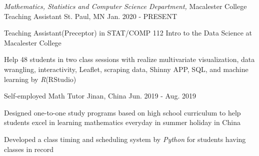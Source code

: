

\begin{cventries}

  \cventry
    {\textit{Mathematics, Statistics and Computer Science Department,} Macalester College} %
    {Teaching Assistant} %
    {St. Paul, MN} %
    {Jan. 2020 - PRESENT} %
    {
      \begin{cvitems} %
        \item {Teaching Assistant(Preceptor) in STAT/COMP 112 Intro to the Data Science at Macalester College}
        \item {Help 48 students in two class sessions with realize multivariate visualization, data wrangling, interactivity, Leaflet, scraping data, Shinny APP, SQL, and machine learning by  \textit{R}(RStudio)}
      \end{cvitems}
    }


   \cventry
    {Self-employed} %
    {Math Tutor} %
    {Jinan, China} %
    {Jun. 2019 - Aug. 2019} %
    {
      \begin{cvitems} %
        \item {Designed one-to-one study programs based on high school curriculum to help students excel in learning mathematics everyday in summer holiday in China}
        \item {Developed a class timing and scheduling system by \textit{Python} for students having classes in record}
      \end{cvitems}
    }
    

\end{cventries}
